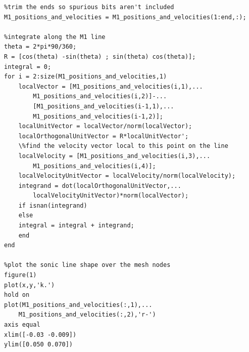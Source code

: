 \documentclass[a4paper, 11pt, oneside]{report}
\begin{document}
\begin{verbatim}
%trim the ends so spurious bits aren't included
M1_positions_and_velocities = M1_positions_and_velocities(1:end,:);

%integrate along the M1 line
theta = 2*pi*90/360;
R = [cos(theta) -sin(theta) ; sin(theta) cos(theta)];
integral = 0;
for i = 2:size(M1_positions_and_velocities,1)
    localVector = [M1_positions_and_velocities(i,1),...
        M1_positions_and_velocities(i,2)]-...
        [M1_positions_and_velocities(i-1,1),...
        M1_positions_and_velocities(i-1,2)];
    localUnitVector = localVector/norm(localVector);
    localOrthogonalUnitVector = R*localUnitVector';
    \%find the velocity vector local to this point on the line
    localVelocity = [M1_positions_and_velocities(i,3),...
        M1_positions_and_velocities(i,4)];
    localVelocityUnitVector = localVelocity/norm(localVelocity);
    integrand = dot(localOrthogonalUnitVector,...
        localVelocityUnitVector)*norm(localVector);
    if isnan(integrand)
    else
    integral = integral + integrand;
    end
end

%plot the sonic line shape over the mesh nodes
figure(1)
plot(x,y,'k.')
hold on
plot(M1_positions_and_velocities(:,1),...
    M1_positions_and_velocities(:,2),'r-')
axis equal
xlim([-0.03 -0.009])
ylim([0.050 0.070])
\end{verbatim}
\end{document}
